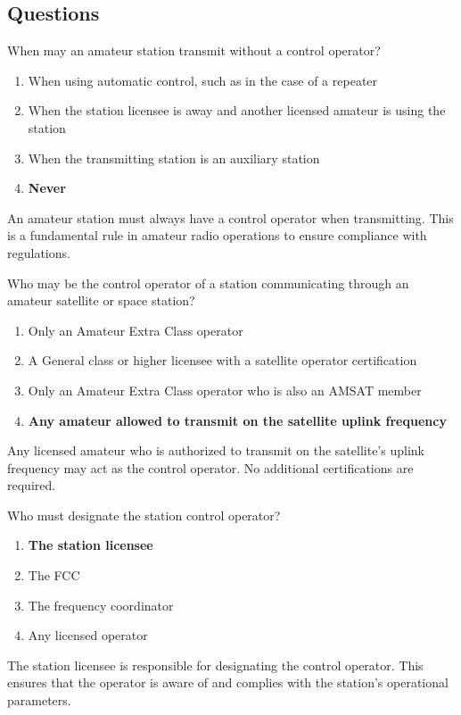 \subsection*{Questions}
\begin{tcolorbox}[colback=gray!10!white,colframe=black!75!black,title={T1E01}]
When may an amateur station transmit without a control operator?
\begin{enumerate}[label=\Alph*,noitemsep]
    \item When using automatic control, such as in the case of a repeater
    \item When the station licensee is away and another licensed amateur is using the station
    \item When the transmitting station is an auxiliary station
    \item \textbf{Never}
\end{enumerate}
\end{tcolorbox}
An amateur station must always have a control operator when transmitting. This is a fundamental rule in amateur radio operations to ensure compliance with regulations.


\begin{tcolorbox}[colback=gray!10!white,colframe=black!75!black,title={T1E02}]
Who may be the control operator of a station communicating through an amateur satellite or space station?
\begin{enumerate}[label=\Alph*,noitemsep]
    \item Only an Amateur Extra Class operator
    \item A General class or higher licensee with a satellite operator certification
    \item Only an Amateur Extra Class operator who is also an AMSAT member
    \item \textbf{Any amateur allowed to transmit on the satellite uplink frequency}
\end{enumerate}
\end{tcolorbox}
Any licensed amateur who is authorized to transmit on the satellite's uplink frequency may act as the control operator. No additional certifications are required.


\begin{tcolorbox}[colback=gray!10!white,colframe=black!75!black,title={T1E03}]
Who must designate the station control operator?
\begin{enumerate}[label=\Alph*,noitemsep]
    \item \textbf{The station licensee}
    \item The FCC
    \item The frequency coordinator
    \item Any licensed operator
\end{enumerate}
\end{tcolorbox}
The station licensee is responsible for designating the control operator. This ensures that the operator is aware of and complies with the station's operational parameters.

